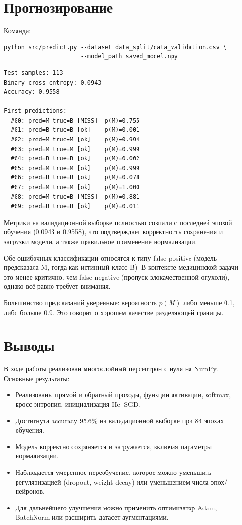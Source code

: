 \documentclass[12pt,a4paper]{article}
\begin{document}
\section{Прогнозирование}

Команда:

\begin{lstlisting}
python src/predict.py --dataset data_split/data_validation.csv \
                      --model_path saved_model.npy
\end{lstlisting}

\begin{verbatim}
Test samples: 113
Binary cross-entropy: 0.0943
Accuracy: 0.9558

First predictions:
  #00: pred=M true=B [MISS]  p(M)=0.755
  #01: pred=B true=B [ok]    p(M)=0.001
  #02: pred=M true=M [ok]    p(M)=0.994
  #03: pred=M true=M [ok]    p(M)=0.999
  #04: pred=B true=B [ok]    p(M)=0.002
  #05: pred=M true=M [ok]    p(M)=0.999
  #06: pred=B true=B [ok]    p(M)=0.078
  #07: pred=M true=M [ok]    p(M)=1.000
  #08: pred=M true=B [MISS]  p(M)=0.881
  #09: pred=B true=B [ok]    p(M)=0.011
\end{verbatim}

Метрики на валидационной выборке полностью совпали с последней эпохой обучения
(0.0943 и 0.9558), что подтверждает корректность сохранения и загрузки модели,
а также правильное применение нормализации.

Обе ошибочных классификации относятся к типу false positive (модель предсказала
M, тогда как истинный класс B). В контексте медицинской задачи это менее
критично, чем false negative (пропуск злокачественной опухоли), однако всё
равно требует внимания.

Большинство предсказаний уверенные: вероятность $p(M)$ либо меньше 0.1, либо
больше 0.9. Это говорит о хорошем качестве разделяющей границы.

\section{Выводы}

В ходе работы реализован многослойный персептрон с нуля на NumPy. Основные
результаты:

\begin{itemize}
  \item Реализованы прямой и обратный проходы, функции активации, softmax,
        кросс-энтропия, инициализация He, SGD.
  \item Достигнута accuracy 95.6\% на валидационной выборке при 84 эпохах
        обучения.
  \item Модель корректно сохраняется и загружается, включая параметры
        нормализации.
  \item Наблюдается умеренное переобучение, которое можно уменьшить
        регуляризацией (dropout, weight decay) или уменьшением числа
        эпох/нейронов.
  \item Для дальнейшего улучшения можно применить оптимизатор Adam,
        BatchNorm или расширить датасет аугментациями.
\end{itemize}
\end{document}
